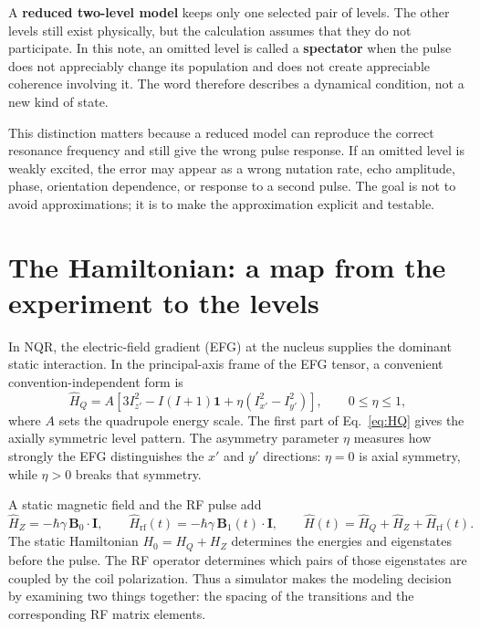 \documentclass[11pt,letterpaper]{article}
\newcommand{\HQ}{\hat H_Q}
\newcommand{\HZ}{\hat H_Z}
\newcommand{\Hrf}{\hat H_{\mathrm{rf}}}
\begin{document}
A \textbf{reduced two-level model} keeps only one selected pair of levels. The other levels still exist physically, but the calculation assumes that they do not participate. In this note, an omitted level is called a \textbf{spectator} when the pulse does not appreciably change its population and does not create appreciable coherence involving it. The word therefore describes a dynamical condition, not a new kind of state.

This distinction matters because a reduced model can reproduce the correct resonance frequency and still give the wrong pulse response. If an omitted level is weakly excited, the error may appear as a wrong nutation rate, echo amplitude, phase, orientation dependence, or response to a second pulse. The goal is not to avoid approximations; it is to make the approximation explicit and testable.

\section{The Hamiltonian: a map from the experiment to the levels}

In NQR, the electric-field gradient (EFG) at the nucleus supplies the dominant static interaction. In the principal-axis frame of the EFG tensor, a convenient convention-independent form is
\begin{equation}
\HQ=A\left[3I_{z'}^2-I(I+1)\mathbf 1
+\eta\left(I_{x'}^2-I_{y'}^2\right)\right],
\qquad 0\leq\eta\leq1,
\label{eq:HQ}
\end{equation}
where $A$ sets the quadrupole energy scale. The first part of Eq.~\eqref{eq:HQ} gives the axially symmetric level pattern. The asymmetry parameter $\eta$ measures how strongly the EFG distinguishes the $x'$ and $y'$ directions: $\eta=0$ is axial symmetry, while $\eta>0$ breaks that symmetry.

A static magnetic field and the RF pulse add
\begin{equation}
\HZ=-\hbar\gamma\,\mathbf B_0\!\cdot\!\mathbf I,
\qquad
\Hrf(t)=-\hbar\gamma\,\mathbf B_1(t)\!\cdot\!\mathbf I,
\qquad
\hat H(t)=\HQ+\HZ+\Hrf(t).
\label{eq:Htotal}
\end{equation}
The static Hamiltonian $H_0=H_Q+H_Z$ determines the energies and eigenstates before the pulse. The RF operator determines which pairs of those eigenstates are coupled by the coil polarization. Thus a simulator makes the modeling decision by examining two things together: the spacing of the transitions and the corresponding RF matrix elements.
\end{document}
